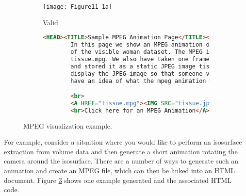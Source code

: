 
\begin{figure}[htb]
    \centering
	\begin{subfigure}[h]{0.76\linewidth}
		\texttt{[image: Figure11-1a]}
		\captionsetup{justification=centering}
		\caption*{Valid}
		\label{fig:Figure11-1a}
	\end{subfigure}
	\hfill
	\begin{subfigure}[h]{0.76\linewidth}
       \begin{lstlisting}[language=HTML,  caption={}, numbers=none, frame=none]
        <HEAD><TITLE>Sample MPEG Animation Page</TITLE></HEAD>
        In this page we show an MPEG animation of a visualization
        of the visible woman dataset. The MPEG is stored in a file
        tissue.mpg. We also have taken one frame from the animation
        and stored it as a static JPEG image tissue.jpg. We
        display the JPEG image so that someone visiting the site will
        have an idea of what the mpeg animation will contain.

        <br>
        <A HREF="tissue.mpg"><IMG SRC="tissue.jpg">
        <br>Click here for an MPEG Animation</A>
        \end{lstlisting}
        \label{fig:Figure11-1d}
	\end{subfigure}
	\caption{MPEG visualization example.}\label{fig:Figure11-1}
\end{figure}

For example, consider a situation where you would like to perform an isosurface extraction from volume data and then generate a short animation rotating the camera around the isosurface. There are a number of ways to generate such an animation and create an MPEG file, which can then be linked into an HTML document. Figure \ref{fig:Figure11-1} shows one example generated and the associated HTML code.

